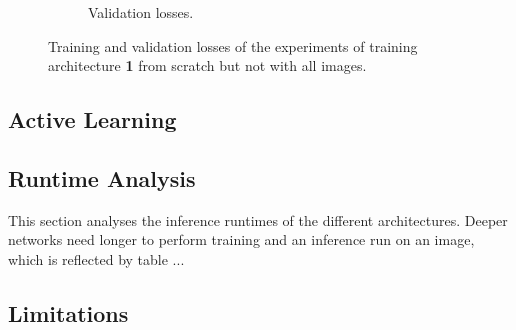 \begin{figure}[!tbp]
\begin{subfigure}[t]{0.48\textwidth}
		\caption{Validation losses.}
	\end{subfigure}
	\caption{Training and validation losses of the experiments of training architecture \textbf{1} from scratch but not with all images.}
	\label{fig:experiments_online_sratch_loss}
\end{figure} 


\subsection{Active Learning} \label{subsection:experiments_active_learning}


\subsection{Runtime Analysis}

This section analyses the inference runtimes of the different architectures. Deeper networks need longer to perform training and an inference run on an image, which is reflected by table ...

\subsection{Limitations}






